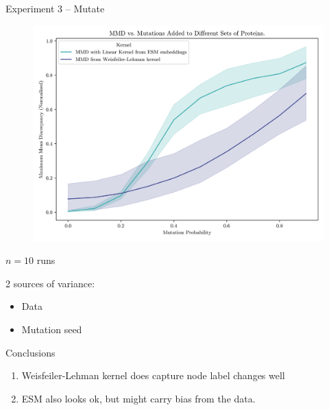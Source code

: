\documentclass[aspectratio=169, 10pt, dvipsnames]{beamer}
\begin{document}
{
\begin{frame}[fragile]{Experiment 3 -- Mutate}
 \begin{minipage}{0.6\linewidth}
    \begin{figure}
      \centering
      \includegraphics[width=\textwidth]{./figures/mutation.png}
    \end{figure}
  \end{minipage}
  \begin{minipage}{0.38\linewidth}
    \pause $n=10$ runs

    \pause\small 2 sources of variance:
    \begin{itemize}
      \pause\small\item Data
      \pause\small\item Mutation seed
  \end{itemize}

  \begin{alert}{Conclusions}
    \begin{enumerate}
      \pause\item Weisfeiler-Lehman kernel does capture node label changes well
      \pause\item ESM also looks ok, but might carry bias from the data.
    \end{enumerate}
  \end{alert}
  \end{minipage}
\end{frame}
}
\end{document}

